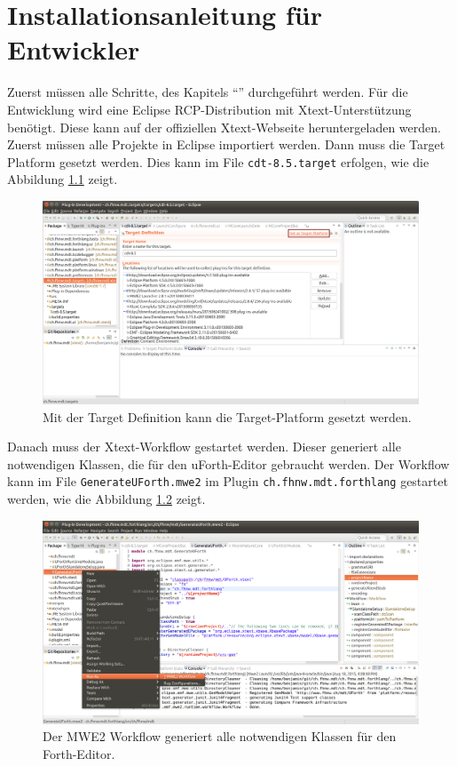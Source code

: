 \documentclass[listof=totocnumbered,bibliography=totocnumbered]{scrreprt}
\numberwithin{equation}{subsection}
\begin{document}
\newpage
\chapter{Installationsanleitung für Entwickler}

Zuerst müssen alle Schritte, des Kapitels "`"' durchgeführt werden. Für die Entwicklung wird eine Eclipse RCP-Distribution mit Xtext-Unterstützung benötigt. Diese kann auf der offiziellen Xtext-Webseite\cite{downloadxtext} heruntergeladen werden. Zuerst müssen alle Projekte in Eclipse importiert werden. Dann muss die Target Platform gesetzt werden. Dies kann im File \verb!cdt-8.5.target! erfolgen, wie die Abbildung \ref{fig:selecttarget} zeigt.

\begin{figure}[H]
	\centering
		\includegraphics[scale=0.25]{targetplatform.png}
		\caption{Mit der Target Definition kann die Target-Platform gesetzt werden.}
		\label{fig:selecttarget}
\end{figure}

Danach muss der Xtext-Workflow gestartet werden. Dieser generiert alle notwendigen Klassen, die für den uForth-Editor gebraucht werden. Der Workflow kann im File \verb!GenerateUForth.mwe2! im Plugin \verb!ch.fhnw.mdt.forthlang! gestartet werden, wie die Abbildung \ref{fig:runmwe2} zeigt.

\begin{figure}[H]
	\centering
		\includegraphics[scale=0.25]{runmwe2.png}
		\caption{Der MWE2 Workflow generiert alle notwendigen Klassen für den Forth-Editor.}
		\label{fig:runmwe2}
\end{figure}
\end{document}
